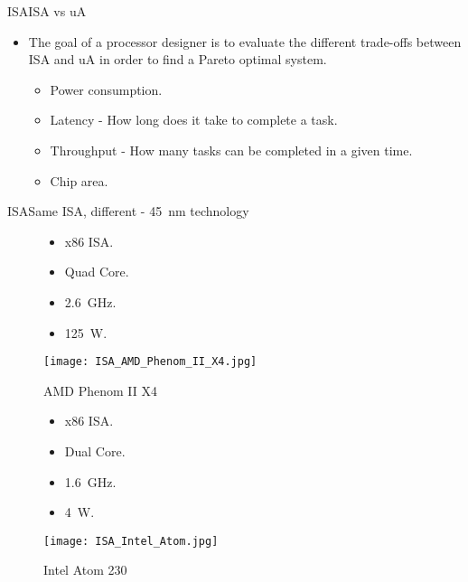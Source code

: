 \begin{frame}{\acl{ISA}}{\acs{ISA} vs \acs{uA}}
\begin{itemize}
  \item The goal of a processor designer is to evaluate the different trade-offs between \ac{ISA} and \ac{uA} in order to find a Pareto optimal system.
  \begin{itemize}
    \item Power consumption.
	\item Latency - How long does it take to complete a task.
	\item Throughput - How many tasks can be completed in a given time.
	\item Chip area.
  \end{itemize}	 
\end{itemize}
\end{frame}

\begin{frame}{\acl{ISA}}{Same \ac{ISA}, different \uA - 45~nm technology}
\begin{figure}[!htb]
  \begin{minipage}{0.5\textwidth}
    \centering
    \begin{itemize}
      \item x86 \ac{ISA}.
      \item Quad Core.
      \item 2.6~GHz.
      \item 125~W.
    \end{itemize}
    \texttt{[image: ISA\_AMD\_Phenom\_II\_X4.jpg]}
    \caption{AMD Phenom II X4}
    \label{Figure:AMD_Phenom_X4a}
  \end{minipage}%
  \begin{minipage}{0.50\textwidth}
    \centering
    \begin{itemize}
      \item x86 \ac{ISA}.
      \item Dual Core.
      \item 1.6~GHz.
      \item 4~W.
    \end{itemize}
    \vspace{14mm}
    \texttt{[image: ISA\_Intel\_Atom.jpg]}
    \caption{Intel Atom 230}
    \label{Figure:Intel_Atom}
  \end{minipage}
\end{figure}
\end{frame}

